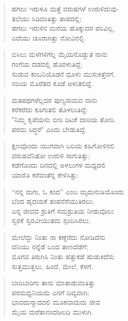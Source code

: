 \begin{verse}
ಹಗಲು ಇರುಳೂ ಮತ್ತೆ ವರುಷಗಳೆ ಉರುಳಿದುವು-\\ತಲೆಯು ಸಿಡಿವಂತಿತ್ತು ತಾಪದಲ್ಲಿ; \\ಹಗಲು ಇರುಳಿನ ಮನೆಯ ಹೊಕ್ಕುದರ ಪರಿವಿಲ್ಲ,\\ಎದೆಯು ಚೂರಾಗಿತ್ತು ನೋವಿನಲ್ಲಿ.
\end{verse}

\begin{verse}
ಬಿಸಿಲು ಮಳೆಗಳಿಗೆಲ್ಲ ಮೈಯನೊಡ್ಡುತ ನಾನು\\ಗಂಗೆಯ ದಡದಲ್ಲಿ ಹೊರಳುತಿದ್ದೆ;\\ಸುಡುವ ಕಂಬನಿಯೊಡನೆ ಧೂಳು ಮುಸುಕಿತ್ತೆನಗೆ,\\ನದಿಯ ಮೊರೆತದ ಕೂಡೆ ಅಳುತಲಿದ್ದೆ.
\end{verse}

\begin{verse}
ಮತಪಥಗಳೆಲ್ಲದರ ಪುಣ್ಯನಾಮವ ನಾನು\\ಕರೆಕರೆದು ಕೂಗುತಲಿ ತೊಳಲುತಿದ್ದೆ:\\"ನಿಮ್ಮ ಕೃಪೆಯನು ಬೀರಿ ದಿಟಕೆ ದಾರಿಯ ತೋರಿ,\\ಪರಮ ಸಿದ್ಧರೆ" ಎಂದು ಬೇಡುತಿದ್ದೆ. 
\end{verse}

\begin{verse}
ಕ್ಷಣವೊಂದು ಯುಗವಾಗಿ ಬರಿಯ ಕಹಿಗೋಳಿನಲಿ\\ವರುಷವೆನಿತೋ ಉರುಳಿ ಸಾಗುತಿತ್ತು;\\ಕಡೆಗೊಂದು ದಿನದಲ್ಲಿ ಅಳಲುಗಳ ಮಧ್ಯದಲಿ\\ಯಾರೊ ಕರೆವಂತೆನ್ನ ಕೇಳಿಸಿತ್ತು:
\end{verse}

\begin{verse}
“ನನ್ನ ಮಗು, ಓ ಕಂದ” ಎಂಬ ಮೃದುನುಡಿಯೊಂದು\\ಬೆಂದ ಹೃದಯಕೆ ತಂಪನೆರೆಯುತಿರಲು;\\ಎನ್ನ ಜೀವದ ಶ್ರುತಿಗೆ ಸಮಶ್ರುತಿಯ ನೀಡುವೊಲು\\ಸ್ವರಕೆ ಸ್ವರವೀಯುತದು ಸ್ಪಂದಿಸಿರಲು,
\end{verse}

\begin{verse}
ಮೇಲೆದ್ದು ನಿಂತು ನಾ ಕಣ್ದೆರೆದು ನೋಡಿದೆನು\\ದನಿಯು ನನ್ನೆಡೆ ಬಂದ ತಾಣದೆಡೆಗೆ; \\ಮೊಗವ ತಿರುಗಿಸಿ ನಿಂತು ಹತ್ತುಕಡೆ ಹುಡುಕಿದೆನು\\ಸುತ್ತಮುತ್ತಲು, ಹಿಂದೆ, ಮೇಲೆ, ಕೆಳಗೆ.
\end{verse}

\begin{verse}
ಬಾರಿಬಾರಿಗು ತಾನು ಮಾತಾಡುವಂತಿತ್ತು\\ಪರಮಧ್ವನಿಯದು ಎನಗೆ ದಿವ್ಯವಾಗಿ;\\ಭಾವದುನ್ಮಾದದಲಿ ಮೂಕವಾದುದು ಜೀವ\\ಮೈಯ ಮರೆತಾನಂದಜಲದಿ ಮುಳುಗಿ.
\end{verse}

